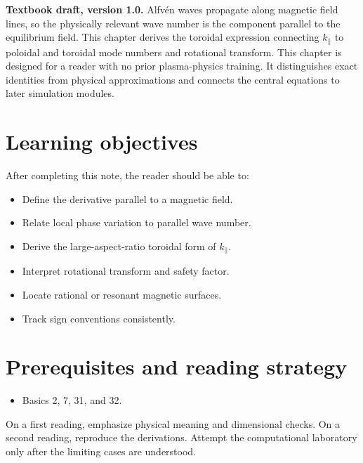 \documentclass[11pt]{article}
\begin{document}

\begin{overviewbox}
\textbf{Textbook draft, version 1.0.} Alfvén waves propagate along magnetic field lines, so the physically relevant wave number is the component parallel to the equilibrium field. This chapter derives the toroidal expression connecting $k_\parallel$ to poloidal and toroidal mode numbers and rotational transform. This chapter is designed for a reader with no prior plasma-physics training. It distinguishes exact identities from physical approximations and connects the central equations to later simulation modules.
\end{overviewbox}

\ProjectTOC

\section{Learning objectives}
After completing this note, the reader should be able to:
\begin{itemize}[leftmargin=1.6em]
\item Define the derivative parallel to a magnetic field.
\item Relate local phase variation to parallel wave number.
\item Derive the large-aspect-ratio toroidal form of $k_\parallel$.
\item Interpret rotational transform and safety factor.
\item Locate rational or resonant magnetic surfaces.
\item Track sign conventions consistently.
\end{itemize}

\section{Prerequisites and reading strategy}
\begin{itemize}[leftmargin=1.6em]
\item Basics 2, 7, 31, and 32.
\end{itemize}
On a first reading, emphasize physical meaning and dimensional checks. On a second reading, reproduce the derivations. Attempt the computational laboratory only after the limiting cases are understood.
\end{document}
